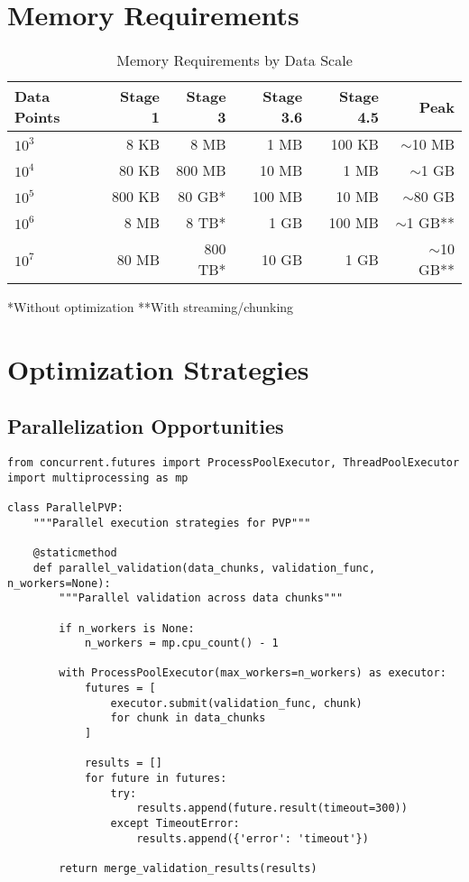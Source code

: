 \documentclass[12pt,oneside]{memoir}
\theoremstyle{plain}
\theoremstyle{definition}
\theoremstyle{remark}
\begin{document}
\section{Memory Requirements}

\begin{table}[h]
\centering
\caption{Memory Requirements by Data Scale}
\begin{tabular}{lrrrrr}
\toprule
\textbf{Data Points} & \textbf{Stage 1} & \textbf{Stage 3} & \textbf{Stage 3.6} & \textbf{Stage 4.5} & \textbf{Peak} \\
\midrule
$10^3$ & 8 KB & 8 MB & 1 MB & 100 KB & $\sim$10 MB \\
$10^4$ & 80 KB & 800 MB & 10 MB & 1 MB & $\sim$1 GB \\
$10^5$ & 800 KB & 80 GB* & 100 MB & 10 MB & $\sim$80 GB \\
$10^6$ & 8 MB & 8 TB* & 1 GB & 100 MB & $\sim$1 GB** \\
$10^7$ & 80 MB & 800 TB* & 10 GB & 1 GB & $\sim$10 GB** \\
\bottomrule
\end{tabular}
\end{table}
*Without optimization **With streaming/chunking

\section{Optimization Strategies}

\subsection{Parallelization Opportunities}

\begin{lstlisting}[caption={Parallel Execution Framework}]
from concurrent.futures import ProcessPoolExecutor, ThreadPoolExecutor
import multiprocessing as mp

class ParallelPVP:
    """Parallel execution strategies for PVP"""
    
    @staticmethod
    def parallel_validation(data_chunks, validation_func, n_workers=None):
        """Parallel validation across data chunks"""
        
        if n_workers is None:
            n_workers = mp.cpu_count() - 1
        
        with ProcessPoolExecutor(max_workers=n_workers) as executor:
            futures = [
                executor.submit(validation_func, chunk)
                for chunk in data_chunks
            ]
            
            results = []
            for future in futures:
                try:
                    results.append(future.result(timeout=300))
                except TimeoutError:
                    results.append({'error': 'timeout'})
        
        return merge_validation_results(results)
\end{lstlisting}
\end{document}
